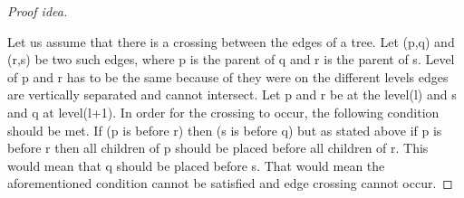 \documentclass{article}
\begin{document}
\begin{proof}[Proof idea]
\begin{center}
\end{center}
Let us assume that there is a crossing between the edges of a tree. Let (p,q) and (r,s) be two such edges, where p is the parent of q and r is the parent of s. Level of p and r has to be the same because of they were on the different levels edges are vertically separated and cannot intersect. Let p and r be at the level(l) and s and q at level(l+1). In order for the crossing to occur, the following condition should be met. If (p is before r) then (s is before q) but as stated above if p is before r then all children of p should be placed before all children of r. This would mean that q should be placed before s. That would mean the aforementioned condition cannot be satisfied and edge crossing cannot occur.    
\end{proof}
\
  
\end{document}
